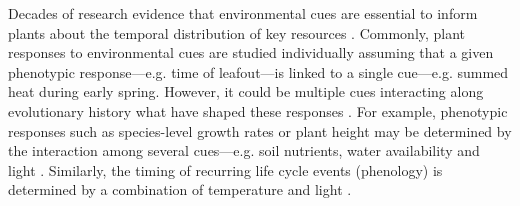 \documentclass{article}\usepackage[]{graphicx}\usepackage[]{color}
\begin{document}

Decades of research evidence that environmental cues are essential to inform plants about the temporal distribution of key resources \citep{}. Commonly, plant responses to environmental cues are studied individually assuming that a given phenotypic response---e.g. time of leafout---is linked to a single cue---e.g. summed heat during early spring. However, it could be multiple cues interacting along evolutionary history what have shaped these responses \citep{}. For example, phenotypic responses such as species-level growth rates or plant height may be determined by the interaction among several cues---e.g. soil nutrients, water availability and light \citep{}. Similarly, the timing of recurring life cycle events (phenology) is determined by a combination of temperature and light \citep{}.\\
\end{document}

